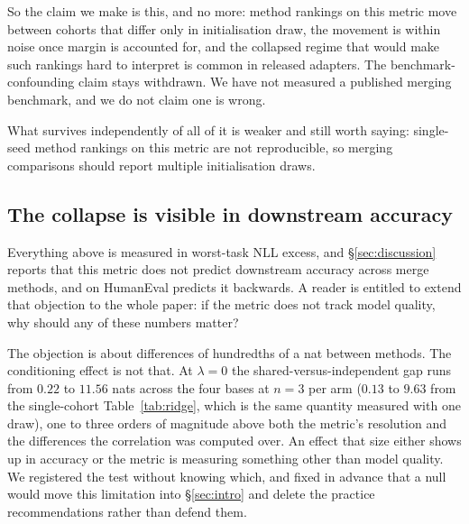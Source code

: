 So the claim we make is this, and no more: method rankings on this metric
move between cohorts that differ only in initialisation draw, the movement
is within noise once margin is accounted for, and the collapsed regime that
would make such rankings hard to interpret is common in released adapters.
The benchmark-confounding claim stays withdrawn. We have not measured a
published merging benchmark, and we do not claim one is wrong.

What survives independently of all of it is weaker and still worth saying:
single-seed method rankings on this metric are not reproducible, so merging
comparisons should report multiple initialisation draws.

\subsection{The collapse is visible in downstream accuracy}
\label{subsec:downstream-cond}

Everything above is measured in worst-task NLL excess, and
\S\ref{sec:discussion} reports that this metric does not predict downstream
accuracy across merge methods, and on HumanEval predicts it backwards. A
reader is entitled to extend that objection to the whole paper: if the metric
does not track model quality, why should any of these numbers matter?

The objection is about differences of hundredths of a nat between methods. The
conditioning effect is not that. At $\lambda = 0$ the shared-versus-independent
gap runs from $0.22$ to $11.56$ nats across the four bases at $n = 3$ per
arm ($0.13$ to $9.63$ from the single-cohort Table~\ref{tab:ridge}, which is
the same quantity measured with one draw), one to three orders of magnitude above
both the metric's resolution and the differences the correlation was computed
over. An effect that size either shows up in accuracy or the metric is
measuring something other than model quality. We registered the test without
knowing which, and fixed in advance that a null would move this limitation into
\S\ref{sec:intro} and delete the practice recommendations rather than defend
them.

